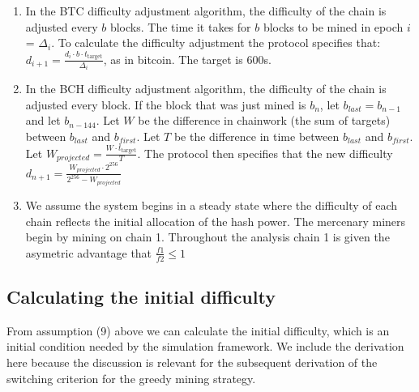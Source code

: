 \documentclass[10pt, preprint]{aastex}
\begin{document}
\begin{enumerate}
\item
In the BTC difficulty adjustment algorithm, the difficulty of the chain is adjusted every $b$ blocks.  The time it takes for $b$ blocks to be mined in epoch $i$ = $\Delta_i$.  To calculate the difficulty adjustment the protocol specifies that: $d_{i+1} = \frac{ d_i \cdot b \cdot t_{\text{target}} }{ \Delta_i}$, as in bitcoin.  The target is 600s.
\item 
In the BCH difficulty adjustment algorithm, the difficulty of the chain is adjusted every block. If the block that was just mined is $b_n$, let $b_{last} = b_{n-1}$ and let $b_{n-144}$. Let $W$ be the difference in chainwork (the sum of targets) between $b_{last}$ and $b_{first}$. Let $T$ be the difference in time between $b_{last}$ and $b_{first}$. Let $W_{projected} = \frac{W \cdot t_{\text{target}} }{T}$. The protocol then specifies that the new difficulty $d_{n+1} = \frac{ W_{projected} \cdot 2^{256} }{ 2^{256} - W_{projected} }$

\item
We assume the system begins in a steady state where the difficulty of each chain reflects the initial allocation of the hash power.  The mercenary miners begin by mining on chain 1.  Throughout the analysis chain 1 is given the asymetric advantage that $\frac{f1}{f2} \leq 1$
\end{enumerate}

\subsection{Calculating the initial difficulty}

From assumption (9) above we can calculate the initial difficulty, which is an initial condition needed by the simulation framework.  We include the derivation here because the discussion is relevant for the subsequent derivation of the switching criterion for the greedy mining strategy.  
\end{document}

